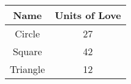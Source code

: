 \begin{tabular}{|c|c|}
  Name & Units of Love \\ \hline
  Circle   &  27 \\
  Square   &  42 \\
  Triangle &  12 \\
\end{tabular}
